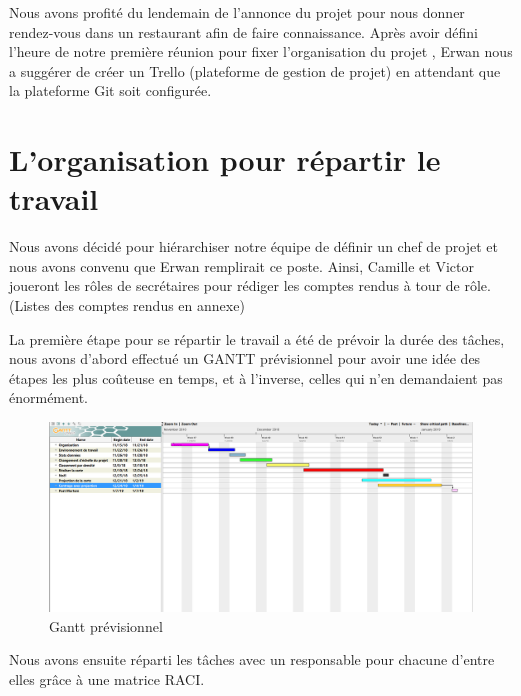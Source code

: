 \documentclass{article}
\begin{document}
Nous avons profité du lendemain de l’annonce du projet pour nous donner rendez-vous dans un restaurant afin de faire connaissance. Après avoir défini l’heure de notre première réunion pour fixer l’organisation du projet , Erwan nous a suggérer de créer un Trello (plateforme de gestion de projet) en attendant que la plateforme Git soit configurée.

\vspace{1\baselineskip}


\section{ L'organisation pour répartir le travail }


Nous avons décidé pour hiérarchiser notre équipe de définir un chef de projet et nous avons convenu que Erwan remplirait ce poste.
Ainsi, Camille et Victor joueront les rôles de secrétaires pour rédiger les comptes rendus à tour de rôle. (Listes des comptes rendus en annexe)

\vspace{1\baselineskip}

La première étape pour se répartir le travail a été de prévoir la durée des tâches, nous avons d’abord effectué un GANTT prévisionnel pour avoir une idée des étapes les plus coûteuse en temps, et à l’inverse, celles qui n’en demandaient pas énormément.

\vspace{1\baselineskip}

\begin{figure}[H]
    \centering
    \includegraphics[scale=0.4]{gantt.png}
    \caption{Gantt prévisionnel}
    \label{fig:gantt}
\end{figure}

Nous avons ensuite réparti les tâches avec un responsable pour chacune d’entre elles grâce à une matrice RACI.

\vspace{1\baselineskip}
\end{document}
